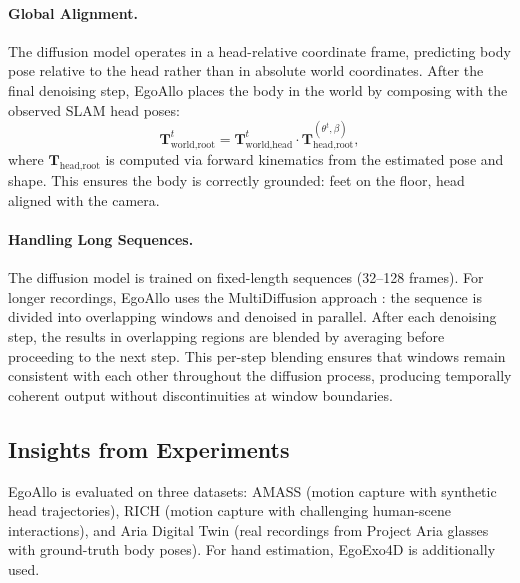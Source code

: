 \documentclass[../../book-main.tex]{subfiles}
\begin{document}
\paragraph{Global Alignment.}
The diffusion model operates in a head-relative coordinate frame,
predicting body pose relative to the head rather than in absolute
world coordinates. After the final denoising step, EgoAllo places the
body in the world by composing with the observed SLAM head poses:
\begin{equation}
\boldsymbol{T}_{\text{world},\text{root}}^t
=
\boldsymbol{T}_{\text{world},\text{head}}^t
\cdot
\boldsymbol{T}_{\text{head},\text{root}}^{(\theta^t, \beta)},
\end{equation}
where $\boldsymbol{T}_{\text{head},\text{root}}$ is computed via forward
kinematics from the estimated pose and shape. This ensures the body
is correctly grounded: feet on the floor, head aligned with the camera.

\paragraph{Handling Long Sequences.}
The diffusion model is trained on fixed-length sequences (32--128
frames). For longer recordings, EgoAllo uses the MultiDiffusion
approach \citep{bar2023multidiffusion}: the sequence is divided into
overlapping windows and denoised in parallel. After each denoising
step, the results in overlapping regions are blended by averaging
before proceeding to the next step. This per-step blending ensures
that windows remain consistent with each other throughout the
diffusion process, producing temporally coherent output without
discontinuities at window boundaries.

\subsection{Insights from Experiments}
\label{sub:egoallo_experiments}

EgoAllo is evaluated on three datasets: AMASS
\citep{mahmood2019amass} (motion capture with synthetic head
trajectories), RICH \citep{huang2022rich} (motion capture with
challenging human-scene interactions), and Aria Digital Twin
\citep{pan2023aria} (real recordings from Project Aria glasses with
ground-truth body poses). For hand estimation, EgoExo4D
\citep{grauman2023egoexo4d} is additionally used.
\end{document}
